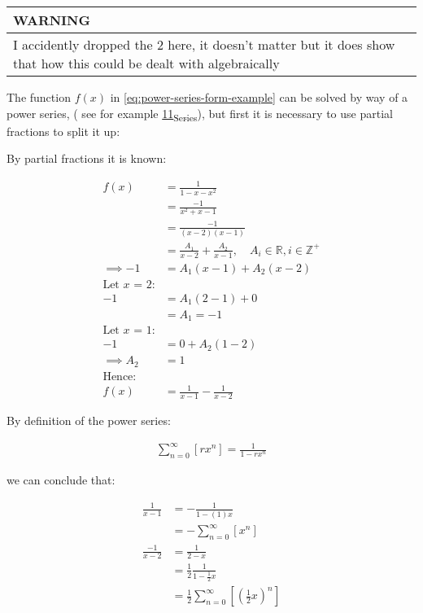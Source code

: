 \documentclass[11pt]{article}
\begin{document}
\begin{center}
\begin{tabular}{l}
WARNING\\
\hline
I accidently dropped the \(2\) here, it doesn't matter but it does show that how this could be dealt with algebraically\\
\end{tabular}
\end{center}

The function \(f(x)\) in \eqref{eq:power-series-form-example} can be solved by way of a power series, ( see for example \href{./University/Analysis/11\_Series.md}{11\textsubscript{Series}}), but first it is
necessary to use partial fractions to split it up:


By partial fractions it is known:

\begin{align*}
    f\left( x \right)&= \frac{1}{1- x- x^2}\\
&= \frac{- 1}{x^2 +  x -  1}\\
&= \frac{- 1}{\left( x- 2 \right)\left( x- 1 \right)}\\
&= \frac{A_1}{x- 2}+  \frac{A_2}{x- 1}, \quad A_i \in \mathbb{R}, i \in \mathbb{Z}^+ \\
 \implies  - 1 &= A_1\left( x- 1 \right) +  A_2\left( x- 2 \right)\\
 \text{Let $x$ = 2:}\\
 - 1&= A_1\left( 2-1 \right) +  0 \\
&= A_1 = - 1 \\
 \text{Let $x$ = 1:}\\
 - 1 &=  0 +  A_2 \left( 1- 2 \right) \\
 \implies  A_2&= 1 \\
 \text{Hence:}\\
 f\left( x \right)&=    \frac{1}{x- 1} - \frac{1}{x- 2}
\end{align*}

By definition of the power series:

\begin{align}
\sum^{\infty}_{n= 0}\left[ rx^n \right] = \frac{1}{1- rx^n} \label{eq:pow-series-definition}
\end{align}

we can conclude that:

\begin{align*}
\frac{1}{x- 1}&= -\frac{1}{1 -\left( 1 \right) x} \\
&= -\sum^{\infty}_{n= 0}\left[ x^n \right]  \\
\frac{-1}{x- 2} &= \frac{1}{2- x} \\
&= \frac{1}{2}\frac{1}{1-\frac{1}{2}x} \\
&= \frac{1}{2} \sum^{\infty}_{n= 0}\left[ \left( \frac{1}{2}x \right) ^n \right]
\end{align*}
\end{document}
